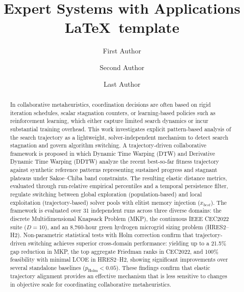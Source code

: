 \documentclass[review]{elsarticle}
\begin{document}
\begin{frontmatter}
\begin{titlepage}
\begin{center}
\begin{flushleft}
\end{flushleft}        
\end{center}
\end{titlepage}

\title{Expert Systems with Applications \LaTeX\ template}

\author[label1,label2]{First Author}

\author[label1]{Second Author}

\author[label3]{Last Author }

\address[label1]{Full address of first author, including the country name}
\address[label2]{Full address of second author, including the country name}
\address[label3]{Full address of last author, including the country name}
\begin{abstract}
In collaborative metaheuristics, coordination decisions are often based on
rigid iteration schedules, scalar stagnation counters, or learning-based
policies such as reinforcement learning, which either capture limited search
dynamics or incur substantial training overhead. This work investigates
explicit pattern-based analysis of the search trajectory as a lightweight,
solver-independent mechanism to detect search stagnation and govern algorithm
switching. A trajectory-driven collaborative framework is proposed in which
Dynamic Time Warping (DTW) and Derivative Dynamic Time Warping (DDTW)
analyze the recent best-so-far fitness trajectory against synthetic reference
patterns representing sustained progress and stagnant plateaus under
Sakoe--Chiba band constraints. The resulting elastic distance metrics,
evaluated through run-relative empirical percentiles and a temporal
persistence filter, regulate switching between global exploration
(population-based) and local exploitation (trajectory-based) solver pools
with elitist memory injection ($x_{best}$). The framework is evaluated over
31 independent runs across three diverse domains: the discrete
Multidimensional Knapsack Problem (MKP), the continuous IEEE CEC2022 suite
($D=10$), and an 8,760-hour green hydrogen microgrid sizing problem
(HRES2--H2). Non-parametric statistical tests with Holm correction confirm
that trajectory-driven switching achieves superior cross-domain performance:
yielding up to a 21.5\% gap reduction in MKP, the top aggregate Friedman
ranks in CEC2022, and 100\% feasibility with minimal LCOE in HRES2--H2,
showing significant improvements over several standalone baselines
($p_{\mathrm{Holm}} < 0.05$). These findings confirm that elastic trajectory
alignment provides an effective mechanism that is less sensitive to changes in objective scale for coordinating
collaborative metaheuristics.
\end{abstract}




\end{frontmatter}
\end{document}
